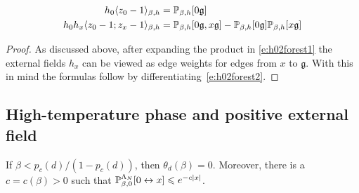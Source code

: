 \documentclass[11pt]{amsart}
\numberwithin{equation}{section}
\numberwithin{theorem}{section}
\newcommand{\ghost}{\mathfrak{g}}
\newcommand{\1}{{\bf 1}}
\begin{document}
\begin{proposition}
  \begin{align} \label{e:z0edge}
    h_{0}\avg{z_0-1}_{\beta,h} &= \P_{\beta,h}[0\ghost]
                          \\
    h_{0}h_{x}\avg{z_0-1;z_x-1}_{\beta,h} &=
    \P_{\beta,h}[0\ghost,x\ghost]-\P_{\beta,h}[0\ghost]\P_{\beta,h}[x\ghost]
  \end{align}
\end{proposition}

\begin{proof}
  As discussed above, after expanding the product in \eqref{e:h02forest1} the external fields $h_{x}$ can be viewed as
  edge weights for edges from $x$ to $\ghost$.  With this in mind the formulas follow by
  differentiating~\eqref{e:h02forest2}.
\end{proof}


\subsection{High-temperature phase and positive external field}
\label{sec:th0}

\begin{proposition}
  \label{prop:theta0}
  If $\beta<p_{c}(d)/(1-p_{c}(d))$, then $\theta_{d}(\beta)=0$.
    Moreover, there is a $c=c(\beta)>0$ such that
    $\P^{\Lambda_{N}}_{\beta,0}[0\leftrightarrow x] \leq e^{-c|x|}$.
\end{proposition}
\end{document}
